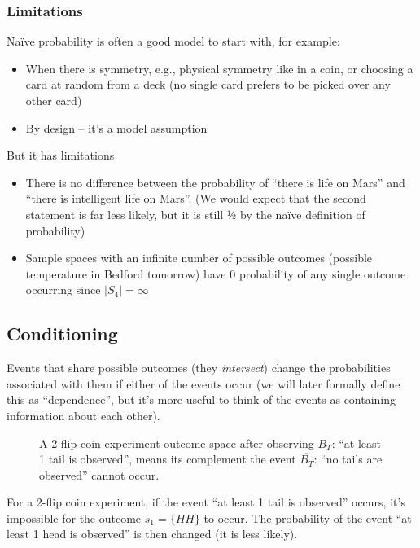 \documentclass[11pt,a4paper]{article}
\begin{document}
\subsubsection{Limitations}

Naïve probability is often a good model to start with, for example:

\begin{itemize}
\item
When there is symmetry, e.g., physical symmetry like in a coin, 
or choosing a card at random from a deck 
(no single card prefers to be picked over any other card)
\item
By design -- it's a model assumption
\end{itemize}

But it has limitations

\begin{itemize}
\item
There is no difference between the probability of ``there is life on Mars'' 
and ``there is intelligent life on Mars''. 
(We would expect that the second statement is far less likely, 
but it is still ½ by the naïve definition of probability)
\item
Sample spaces with an infinite number of possible 
outcomes (possible temperature in Bedford tomorrow) have 0 probability of any single
outcome occurring since \(\left| S_{4} \right| = \infty\)
\end{itemize}

\subsection{Conditioning}

Events that share possible outcomes (they \emph{intersect}) change the probabilities
associated with them if either of the events occur 
(we will later formally define this as ``dependence'', 
but it's more useful to think of the events as containing information about each other).

\begin{figure}[ht!]
\centering

\caption{%
A 2-flip coin experiment outcome space after observing \(B_{T}\): ``at least 1 tail is observed'',
means its complement the event \(\overline{B_{T}}\): ``no tails are observed'' cannot occur.}
\label{fig:conditioning}
\end{figure}

For a 2-flip coin experiment, 
if the event ``at least 1 tail is observed'' occurs, 
it's impossible for the outcome \(s_{1} = \{HH\}\) to occur. 
The probability of the event ``at least 1 head is observed'' is then changed (it is less likely).
\end{document}
